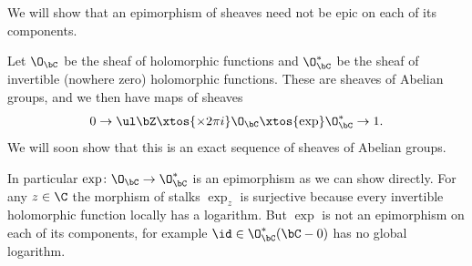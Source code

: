 \enote

\bexam[name={expsequence}]

    We will show that an epimorphism of sheaves need not be epic on each of its components.

    Let $\O_\bC$ be the sheaf of holomorphic functions and $\O_\bC^*$ be the sheaf of invertible (nowhere zero) holomorphic functions.
    These are sheaves of Abelian groups, and we then have maps of sheaves
    $$ 0 \to \ul\bZ \xtos{\times2\pi i} \O_\bC \xtos{\exp} \O_\bC^* \to 1 . $$
    We will soon show that this is an exact sequence of sheaves of Abelian groups.

    In particular $\exp\colon\O_\bC\to\O_\bC^*$ is an epimorphism as we can show directly.
    For any $z\in\C$ the morphism of stalks $\exp_z$ is surjective because every invertible holomorphic function locally has a logarithm.
    But $\exp$ is not an epimorphism on each of its components, for example $\id\in\O_\bC^*(\bC-0)$ has no global logarithm.

\eexam

